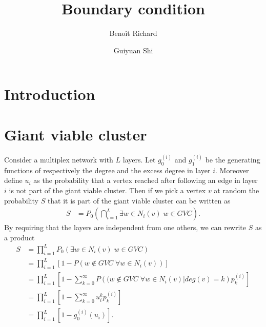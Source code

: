 \documentclass[a4paper]{article}
\title{Boundary condition}
\author{Benoît Richard \and Guiyuan Shi}
\begin{document}
\listoftodos

\maketitle


\section{Introduction}

\section{Giant viable cluster}

Consider a multiplex network with $L$ layers. Let $g_0^{(i)}$ and $g_1^{(i)}$ be the generating functions of respectively the degree and the excess degree in layer $i$. Moreover define $u_i$ as the probability that a vertex reached after following an edge in layer $i$ is not part of the giant viable cluster. Then if we pick a vertex $v$ at random the probability $S$ that it is part of the giant viable cluster can be written as
\begin{align}
	S &= P_0\left(\bigcap_{i = 1}^{L} \exists w \in N_i(v) \; w \in GVC \right).
\end{align}
By requiring that the layers are independent from one others, we can rewrite $S$ as a product
\begin{align}
	S &= \prod_{i = 1}^{L}  P_0\left(\exists w \in N_i(v) \; w \in GVC\right) \\
		&=\prod_{i = 1}^{L}  \left[1 - P\left(w \notin GVC \; \forall w \in N_i(v)\right) \right] \\
		&=\prod_{i = 1}^{L}  \left[1 - \sum_{k = 0}^{\infty} P\left((w \notin GVC \; \forall w \in N_i(v) | deg(v) = k \right) p^{(i)}_k \right] \\
		&=\prod_{i = 1}^{L}  \left[1 - \sum_{k = 0}^{\infty} u_i^k p^{(i)}_k \right] \\
		&=\prod_{i = 1}^{L}  \left[1 - g_0^{(i)}(u_i) \right].\label{Multiplex GCC size final}
\end{align}
\end{document}
